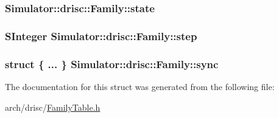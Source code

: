 \hypertarget{struct_simulator_1_1drisc_1_1_family_a67550340cf92f8296561385c287253ac}{
\subsubsection[{state}]{ Simulator\+::drisc\+::\+Family\+::state}}\label{struct_simulator_1_1drisc_1_1_family_a67550340cf92f8296561385c287253ac}
\hypertarget{struct_simulator_1_1drisc_1_1_family_ad194800b2cb33191c069c77f7a2f9e46}{
\subsubsection[{step}]{\setlength{\rightskip}{0pt plus 5cm}S\+Integer Simulator\+::drisc\+::\+Family\+::step}}\label{struct_simulator_1_1drisc_1_1_family_ad194800b2cb33191c069c77f7a2f9e46}
\hypertarget{struct_simulator_1_1drisc_1_1_family_ad4cf98e9058028d164f8688746e697bf}{
\subsubsection[{sync}]{\setlength{\rightskip}{0pt plus 5cm}struct \{ ... \}              Simulator\+::drisc\+::\+Family\+::sync}}\label{struct_simulator_1_1drisc_1_1_family_ad4cf98e9058028d164f8688746e697bf}


The documentation for this struct was generated from the following file\+:\begin{DoxyCompactItemize}
\item 
arch/drisc/\hyperlink{_family_table_8h}{Family\+Table.\+h}\end{DoxyCompactItemize}
